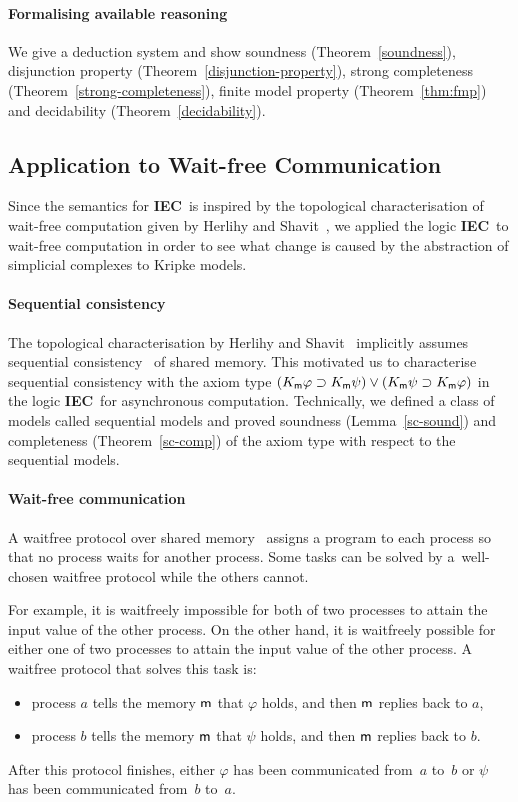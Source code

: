 \documentclass[doctor]{iscs-thesis}
\newcommand{\iec}{{\rm {\textbf{IEC}}}}
\newcommand{\memory}{{\sf m}}
\begin{document}
\paragraph{Formalising available reasoning}
We give a deduction system and show
soundness (Theorem~\ref{soundness}), disjunction property (Theorem~\ref{disjunction-property}),
strong completeness
(Theorem~\ref{strong-completeness}), finite model property
 (Theorem~\ref{thm:fmp}) and decidability (Theorem~\ref{decidability}).

\subsection{Application to Wait-free Communication}

Since the semantics for \iec\, is inspired by the topological characterisation of wait-free
computation given by Herlihy and Shavit~\cite{herlihy1999topological},
we applied the logic \iec\, to wait-free computation in order to see
what change is caused by the abstraction of simplicial complexes to Kripke models.

\paragraph{Sequential consistency}
The topological characterisation by Herlihy and Shavit~\cite{herlihy1999topological}
implicitly assumes sequential consistency~\cite{lamport1979make} of shared memory.  
This motivated us to characterise sequential consistency with the axiom type
$(K_\memory \varphi\supset K_\memory \psi)\vee (K_\memory
       \psi\supset K_\memory \varphi)$
in the logic \iec\, for asynchronous computation.
Technically, we defined a class of models called sequential models
and proved soundness
(Lemma~\ref{sc-sound}) and completeness
 (Theorem~\ref{sc-comp}) of the axiom type with respect to the sequential models.

\paragraph{Wait-free communication}
A waitfree protocol over shared memory~\cite{herlihy1991wait}
 assigns a program to each process so that no process waits for another process.
Some tasks can be solved by a~well-chosen waitfree protocol while the others cannot.

For example, 
 it is waitfreely impossible for both of two processes to attain the input value of the other
 process.
 On the other hand, it is waitfreely possible for
 either one of two processes to attain the input value of the other process.
 A waitfree protocol that solves this task is:
\begin{itemize}
 \item process $a$ tells the memory $\memory$ that $\varphi$ holds, and then $\memory$ replies back to $a$,
 \item process $b$ tells the memory $\memory$ that $\psi$    holds, and then $\memory$ replies back to $b$.
\end{itemize}
After this protocol finishes,
  either $\varphi$ has been communicated from~$a$ to~$b$ 
or $\psi$ has
been communicated from~$b$ to~$a$.
\end{document}
